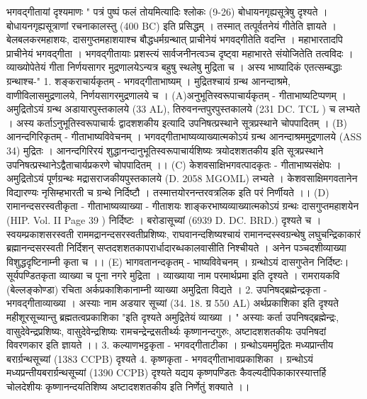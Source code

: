 भगवद्गीतायां दृश्यमाणः " पत्रं पुष्पं फलं तोयमित्यादिः श्लोकः (9-26) बोधायनगृह्यसूत्रेषु दृश्यते । बोधायनगृह्यसूत्राणां रचनाकालस्तु (400 BC) इति प्रसिद्धम् । तस्मात् तत्पूर्वतनेयं गीतेति ज्ञायते । बेलबलकरमहाशयः, दासगुप्तमहाशयाश्च बौद्धधर्मग्रन्थात् प्राचीनेयं भगवद्गीतेति वदन्ति । महाभारतादपि प्राचीनेयं भगवद्गीता । भगवद्गीतायाः प्रशस्त्यं सार्वजनीनत्वञ्च दृष्ट्वा महाभारते संयोजितेति तत्वविदः । व्याख्योपेतेयं गीता निर्णयसागर मुद्रणालयेऽन्यत्र बहुषु स्थलेषु मुद्रिता च । अस्य भाष्यादिकं एतत्सम्बद्धाः ग्रन्थाश्च-"
1. शङ्कराचार्यकृतम् - भगवद्गीताभाष्यम् । मुद्रितश्चायं ग्रन्थ आनन्दाश्रमे, वाणीविलासमुद्रणालये, निर्णयसागरमुद्रणालये च ।
(A)अनुभूतिस्वरूपाचार्यकृतम् - गीताभाष्यटिप्पणम् ।
अमुद्रितोऽयं ग्रन्थ अडायारपुस्तकालये (33 AL), तिरुवनन्तपुरपुस्तकालये (231 DC. TCL ) च लभ्यते । अस्य कर्ताऽनुभूतिस्वरूपाचार्यः द्वादशशकीय इत्यादि उपनिषत्प्रस्थाने सूत्रप्रस्थाने चोपपादितम् । 
(B) आनन्दगिरिकृतम् - गीताभाष्यविवेचनम् । 
भगवद्गीताभाष्यव्याख्यात्मकोऽयं ग्रन्थ आनन्दाश्रममुद्रणालये (ASS 34) मुद्रितः । आनन्दगिरिरयं शुद्धानन्दानुभूतिस्वरूपाचार्यशिष्यः त्रयोदशशतकीय इति सूत्रप्रस्थाने उपनिषत्प्रस्थानेऽद्वैताचार्यप्रकरणे चोपपादितम् ।। 
(C) केशवसाक्षिभगवत्पादकृतः - गीताभाष्यसंक्षेपः ।
अमुद्रितोऽयं पूर्णग्रन्थः मद्रासराजकीयपुस्तकालये  (D. 2058 MGOML)  लभ्यते । केशवसाक्षिमगवतानेन विद्यारण्यः नृसिम्हभारती च ग्रन्थे निर्दिष्टौ । तस्मात्तयोरनन्तरवत्रलिक इति परं निर्णीयते ।। 
(D) रामानन्दसरस्वतीकृता - गीताभाष्यव्याख्या - गीताशयः 
शाङ्करभाष्यव्याख्यात्मकोऽयं ग्रन्थः दासगुप्तमहाशयेन (HIP. Vol. II Page 39 ) निर्दिष्टः । बरोडासूच्यां (6939 D. DC. BRD.) दृश्यते च । स्वयम्प्रकाशसरस्वती राममद्रानन्दसरस्वतीप्रशिष्यः, राघवानन्दशिष्यश्चायं रामानन्दस्स्वग्रन्थेषु लघुचन्द्रिकाकारं ब्रह्मानन्दसरस्वती निर्दिशन् सप्तदशशतकापरार्धादारब्धकालवासीति निश्चीयते । अनेन पञ्चदशीव्याख्या विशुद्धदृष्टिनाम्नी कृता च ।। 
(E) भागवतानन्दकृतम् - भाष्यविवेचनम् ।
ग्रन्थोऽयं दासगुप्तेन निर्दिष्टः। सूर्यपण्डितकृता व्याख्या च पूना नगरे मुद्रिता । व्याख्याया नाम परमार्थप्रमा इति दृश्यते । 
रामरायकवि (बेल्लङ्कोण्डा) रचिता अर्कप्रकाशिकानाम्नी व्याख्या अमुद्रिता विद्यते । 
2. उपनिषद्ब्रह्मेन्द्रकृता - भगवद्गीताव्याख्या ।
अस्याः नाम अडयार सूच्यां (34. 18. ग्र 550 AL) अर्थप्रकाशिका इति दृश्यते महीशूरसूच्यान्तु ब्रह्मतत्वप्रकाशिका "इति दृश्यते अमुद्रितेयं व्याख्या । " अस्याः कर्ता उपनिषद्ब्रह्मेन्द्रः, वासुदेवेन्द्रप्रशिष्यः, वासुदेवेन्द्रशिष्यः रामचन्द्रेन्द्रसतीर्थ्यः कृष्णानन्दगुरुः, अष्टादशशतकीयः उपनिषदां विवरणकार इति ज्ञायते ।।
3. कल्याणभट्टकृता - भगवद्गीताटीका । ग्रन्थोऽयममुद्रितः मध्यप्रान्तीय बरार्ग्रन्थसूच्यां (1383 CCPB) दृश्यते 
4. कृष्णकृता - भगवद्गीताभावप्रकाशिका ।
ग्रन्थोऽयं मध्यप्रन्तीयबरार्ग्रन्थसूच्यां (1390 CCPB) दृश्यते यद्यय कृष्णपण्डितः कैवल्यदीपिकाकारस्यात्तर्हि चोलदेशीयः कृष्णानन्दयतिशिष्य अष्टादशशतकीय इति निर्णेतुं शक्याते ।। 
